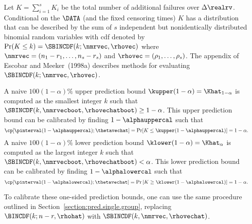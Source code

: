 Let $K=\sum_{i=1}^{s} K_{i}$ be the total number of additional
failures over $\Delta\realrv$.  Conditional on the $\DATA$ (and the
fixed censoring times) $K$ has a distribution that can be described by the
sum of $s$ independent but nonidentically distributed binomial random
variables with cdf denoted by $\Pr(K \leq k)=\SBINCDF(k;\nmrvec,\rhovec)$
where $\nmrvec =(n_{1}-r_{1},\dots,n_{s}-r_{s})$ and
$\rhovec=(\rho_{1},\dots,\rho_{s})$.  The appendix of Escobar and
Meeker~(1998a) describes methods for evaluating
$\SBINCDF(k;\nmrvec,\rhovec)$.

A naive $100(1-\alpha)\%$ upper prediction bound 
$\kupper(1-\alpha)=\Khat_{1-\alpha}$
is computed as the smallest integer $k$ such that 
$\SBINCDF(k,\nmrvecboot,\rhovechatboot) \ge 1-\alpha$. This
upper prediction bound can be calibrated by finding
$1-\alphauppercal$ such that
\begin{displaymath}
\cp[\pinterval(1-\alphauppercal);\thetavechat] =
\Pr[K \leq \kupper(1-\alphauppercal)] = 1-\alpha.
\end{displaymath}
A naive $100(1-\alpha)\%$ lower prediction bound 
$\klower(1-\alpha)=\Khat_{\alpha}$ is computed as the 
largest integer $k$ such that 
$\SBINCDF(k,\nmrvecboot,\rhovechatboot) < \alpha$.
This lower prediction bound can be calibrated by finding
$1-\alphalowercal$ such that
\begin{displaymath}
\cp[\pinterval(1-\alphalowercal); \thetavechat] =
\Pr\left [K \geq \klower(1-\alphalowercal)
    \right ] = 1- \alpha.
\end{displaymath}

To calibrate these one-sided prediction bounds, one can use the same
procedure outlined in Section~\ref{section:pred.single.group},
replacing $\BINCDF(k;n-r,\rhohat)$ with 
$\SBINCDF(k,\nmrvec,\rhovechat)$.

